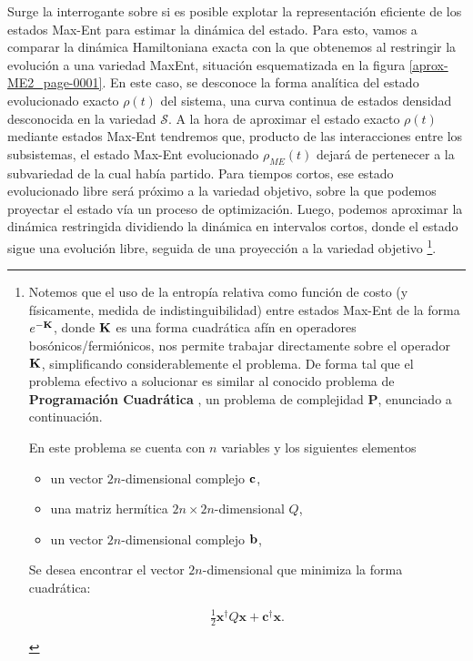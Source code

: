 \documentclass{report} %
\numberwithin{equation}{section}
\begin{document}
Surge la interrogante sobre si es posible explotar la representación eficiente de los estados Max-Ent para estimar la dinámica del estado. Para esto, vamos a comparar  la dinámica Hamiltoniana exacta con la que obtenemos al restringir la evolución a una variedad MaxEnt, situación esquematizada en la figura \ref{aprox-ME2_page-0001}. En este caso, se desconoce la forma analítica del estado evolucionado exacto $\rho(t)$ del sistema, una curva continua de estados densidad desconocida en la variedad $\mathcal{S}$. A la hora de aproximar el estado exacto $\rho(t)$ mediante estados Max-Ent tendremos que, producto de las interacciones entre los subsistemas, el estado Max-Ent evolucionado $\rho_{ME}(t)$  dejará de pertenecer a la subvariedad de la cual había partido. Para tiempos cortos, ese estado evolucionado libre será próximo a la variedad objetivo, sobre la que podemos proyectar el estado vía un proceso de optimización. Luego, podemos aproximar la dinámica restringida dividiendo la dinámica en intervalos cortos, donde el estado sigue una evolución libre, seguida de una proyección a la variedad objetivo \footnote{Notemos que el uso de la entropía relativa como función de costo (y físicamente, medida de indistinguibilidad) entre estados Max-Ent de la forma $e^{-{\bf K} }$, donde ${\bf K}$ es una forma cuadrática afín en operadores bosónicos/fermiónicos, nos permite trabajar directamente sobre el operador ${\bf K}$, simplificando considerablemente el problema. De forma tal que el problema efectivo a solucionar es similar al conocido problema de \textbf{Programación Cuadrática} \cite{NoceWrig06}, un problema de complejidad \textbf{P}, enunciado a continuación.  

\begin{tcolorbox}[colback=red!5!white, colframe=red!50!black, title= Problema de Programación Cuadrática Generalizado ]

En este problema se cuenta con $n$ variables y los siguientes elementos

\begin{itemize}
    \item un vector $2n$-dimensional complejo ${\bf c}$,
    \item una matriz hermítica $2n \times 2n$-dimensional $Q$,
    \item un vector $2n$-dimensional complejo ${\bf b}$,
\end{itemize}

Se desea encontrar el vector $2n$-dimensional que minimiza la forma cuadrática: 

$$
{\displaystyle {\tfrac {1}{2}}\mathbf {x} ^{\dagger }Q\mathbf {x} +\mathbf {c} ^{\dagger }\mathbf {x} }.
$$
\end{tcolorbox}}.
\end{document}
